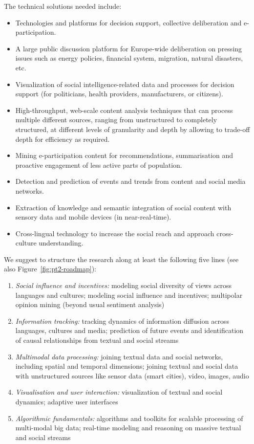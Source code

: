 \documentclass[10pt, plain]{../../metanetpaper}
\begin{document}
\begin{multicols}{2}
The technical solutions needed include:

\begin{itemize}
\item Technologies and platforms for decision support, collective deliberation and e-participation.
\item A large public discussion platform for Europe-wide deliberation on pressing issues such as energy policies, financial system, migration, natural disasters, etc.
\item Visualization of social intelligence-related data and processes for decision support (for politicians, health providers, manufacturers, or citizens).
\item High-throughput, web-scale content analysis techniques that can process multiple different sources, ranging from unstructured to completely structured, at different levels of granularity and depth by allowing to trade-off depth for efficiency as required.
\item Mining e-participation content for recommendations, summarisation and proactive engagement of less active parts of population.
\item Detection and prediction of events and trends from content and social media networks.
\item Extraction of knowledge and semantic integration of social content with sensory data and mobile devices (in near-real-time).
\item Cross-lingual technology to increase the social reach and approach cross-culture understanding.
\end{itemize}

We suggest to structure the research along at least the following five lines (see also Figure~\ref{fig:pt2-roadmap}):

\begin{enumerate}
\item \emph{Social influence and incentives:} modeling social diversity of views across languages and cultures; modeling social influence and incentives; multipolar opinion mining (beyond usual sentiment analysis) 
\item \emph{Information tracking:} tracking dynamics of information diffusion across languages, cultures and media; prediction of future events and identification of causal relationships from textual and social streams
\item \emph{Multimodal data processing:} joining textual data and social networks, including spatial and temporal dimensions; joining textual and social data with unstructured sources like sensor data (smart cities), video, images, audio
\item \emph{Visualisation and user interaction:} visualization of textual and social dynamics; adaptive user interfaces
\item \emph{Algorithmic fundamentals:} algorithms and toolkits for scalable processing of multi-modal big data;
real-time modeling and reasoning on massive textual and social streams
\end{enumerate}


\end{multicols}
\end{document}
